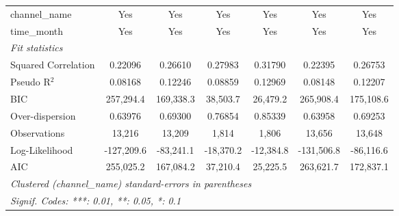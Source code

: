 \begin{table}[htbp]
\begin{tabular}{lcccccc}
      channel\_name                  & Yes                     & Yes                     & Yes                          & Yes                         & Yes                     & Yes\\  
      time\_month                    & Yes                     & Yes                     & Yes                          & Yes                         & Yes                     & Yes\\  
      \midrule
      \emph{Fit statistics}\\
      Squared Correlation            & 0.22096                 & 0.26610                 & 0.27983                      & 0.31790                     & 0.22395                 & 0.26753\\  
      Pseudo R$^2$                   & 0.08168                 & 0.12246                 & 0.08859                      & 0.12969                     & 0.08148                 & 0.12207\\  
      BIC                            & 257,294.4               & 169,338.3               & 38,503.7                     & 26,479.2                    & 265,908.4               & 175,108.6\\  
      Over-dispersion                & 0.63976                 & 0.69300                 & 0.76854                      & 0.85339                     & 0.63958                 & 0.69253\\  
      Observations                   & 13,216                  & 13,209                  & 1,814                        & 1,806                       & 13,656                  & 13,648\\  
      Log-Likelihood                 & -127,209.6              & -83,241.1               & -18,370.2                    & -12,384.8                   & -131,506.8              & -86,116.6\\  
      AIC                            & 255,025.2               & 167,084.2               & 37,210.4                     & 25,225.5                    & 263,621.7               & 172,837.1\\  
      \midrule \midrule
      \multicolumn{7}{l}{\emph{Clustered (channel\_name) standard-errors in parentheses}}\\
      \multicolumn{7}{l}{\emph{Signif. Codes: ***: 0.01, **: 0.05, *: 0.1}}\\
   \end{tabular}
\end{table}


